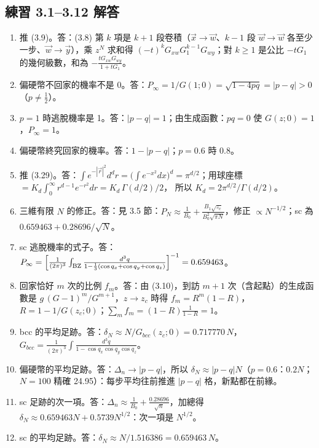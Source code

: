 \subsection{練習 3.1--3.12 解答}
{\small
\begin{enumerate}[label=\textbf{3.\arabic*},itemsep=0.05em]
\item 推 (3.9)。\quad 答：(3.8) 第 $k$ 項是 $k+1$ 段卷積（$\vec x\to\vec w$、$k-1$ 段 $\vec w\to\vec w$ 各至少一步、$\vec w\to\vec y$），乘 $z^N$ 求和得 $(-t)^kG_{xw}G_1^{k-1}G_{wy}$；對 $k\ge1$ 是公比 $-tG_1$ 的幾何級數，和為 $-\frac{tG_{xw}G_{wy}}{1+tG_1}$。
\item 偏硬幣不回家的機率不是 0。\quad 答：$P_\infty=1/G(1;0)=\sqrt{1-4pq}=|p-q|>0$（$p\ne\frac12$）。
\item $p=1$ 時逃脫機率是 1。\quad 答：$|p-q|=1$；由生成函數：$pq=0$ 使 $G(z;0)=1$，$P_\infty=1$。
\item 偏硬幣終究回家的機率。\quad 答：$1-|p-q|$；$p=0.6$ 時 0.8。
\item 推 (3.29)。\quad 答：$\int e^{-|\vec r|^2}d^dr=\big(\int e^{-x^2}dx\big)^d=\pi^{d/2}$；用球座標 $=K_d\int_0^\infty r^{d-1}e^{-r^2}dr=K_d\,\Gamma(d/2)/2$，
所以 $K_d=2\pi^{d/2}/\Gamma(d/2)$。
\item 三維有限 $N$ 的修正。\quad 答：見 3.5 節：$P_N\approx\frac1{B_0}+\frac{B_1\sqrt{z_c}}{B_0^2\sqrt{\pi N}}$，修正 $\propto N^{-1/2}$；sc 為 $0.659463+0.28696/\sqrt N$。
\item sc 逃脫機率的式子。\quad 答：$P_\infty=\Big[\frac{1}{(2\pi)^3}\int_{\rm BZ}\frac{d^3q}{1-\frac13(\cos q_x+\cos q_y+\cos q_z)}\Big]^{-1}=0.659463$。
\item 回家恰好 $m$ 次的比例 $f_m$。\quad 答：由 (3.10)，到訪 $m+1$ 次（含起點）的生成函數是 $g\,(G-1)^m/G^{m+1}$，$z\to z_c$ 時得 $f_m=R^m(1-R)$，$R=1-1/G(z_c;0)$；$\sum_mf_m=(1-R)\frac{1}{1-R}=1$。
\item bcc 的平均足跡。\quad 答：$\delta_N\approx N/G_{bcc}(z_c;0)=0.717770\,N$，$G_{bcc}=\frac{1}{(2\pi)^3}\int\frac{d^3q}{1-\cos q_x\cos q_y\cos q_z}$。
\item 偏硬幣的平均足跡。\quad 答：$\Delta_n\to|p-q|$，所以 $\delta_N\approx|p-q|N$（$p=0.6$：$0.2N$；$N=100$ 精確 24.95）：每步平均往前推進 $|p-q|$ 格，新點都在前緣。
\item sc 足跡的次一項。\quad 答：$\Delta_n\approx\frac1{B_0}+\frac{0.28696}{\sqrt n}$，加總得 $\delta_N\approx0.659463N+0.5739N^{1/2}$：次一項是 $N^{1/2}$。
\item sc 的平均足跡。\quad 答：$\delta_N\approx N/1.516386=0.659463\,N$。
\end{enumerate}}

